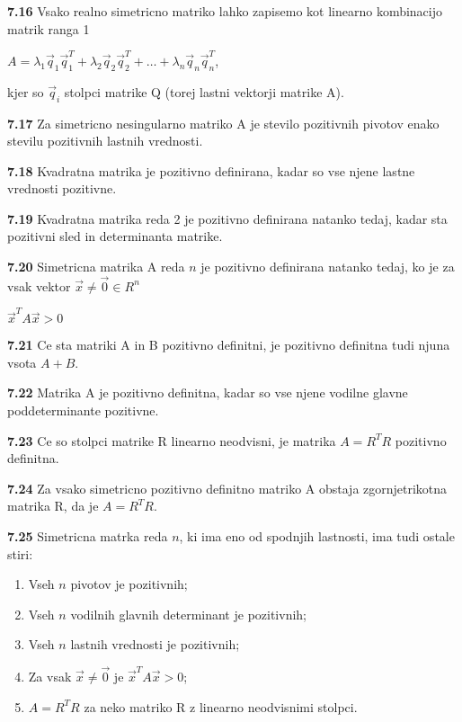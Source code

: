 \documentclass{article}
\begin{document}
\begin{multicols}{4}
\textbf{7.16} Vsako realno simetricno matriko lahko zapisemo kot linearno kombinacijo matrik ranga 1
\begin{center}
    \begin{math}
        A = \lambda_{1}\vec{q}_{1}\vec{q}_{1}^{T} + \lambda_{2}\vec{q}_{2}\vec{q}_{2}^{T} +
        \dots + \lambda_{n}\vec{q}_{n}\vec{q}_{n}^{T} 
    \end{math},
\end{center}
kjer so $\vec{q}_{i}$ stolpci matrike Q (torej lastni vektorji matrike A).

\textbf{7.17} Za simetricno nesingularno matriko A je stevilo pozitivnih pivotov enako
stevilu pozitivnih lastnih vrednosti.

\textbf{7.18} Kvadratna matrika je pozitivno definirana, kadar so vse njene lastne vrednosti pozitivne.

\textbf{7.19} Kvadratna matrika reda 2 je pozitivno definirana natanko tedaj, kadar sta 
pozitivni sled in determinanta matrike.

\textbf{7.20} Simetricna matrika A reda $n$ je pozitivno definirana natanko tedaj, ko je za vsak
vektor $\vec{x} \neq \vec{0} \in R^{n}$
\begin{center}
    $\vec{x}^{T}A\vec{x} > 0$
\end{center}

\textbf{7.21} Ce sta matriki A in B pozitivno definitni, je pozitivno definitna tudi 
njuna vsota $A + B$.

\textbf{7.22} Matrika A je pozitivno definitna, kadar so vse njene vodilne glavne poddeterminante pozitivne.

\textbf{7.23} Ce so stolpci matrike R linearno neodvisni, je matrika $A = R^{T}R$ pozitivno definitna.

\textbf{7.24} Za vsako simetricno pozitivno definitno matriko A obstaja zgornjetrikotna matrika R, da
je $A = R^{T}R$.

\textbf{7.25} Simetricna matrka reda $n$, ki ima eno od spodnjih lastnosti, ima tudi ostale stiri:
\begin{enumerate}
    \item Vseh $n$ pivotov je pozitivnih;
    \item Vseh $n$ vodilnih glavnih determinant je pozitivnih;
    \item Vseh $n$ lastnih vrednosti je pozitivnih;
    \item Za vsak $\vec{x} \neq \vec{0}$ je $\vec{x}^{T}A\vec{x} > 0$;
    \item $A= R^{T}R$ za neko matriko R z linearno neodvisnimi stolpci.
\end{enumerate}


\end{multicols}
\end{document}
